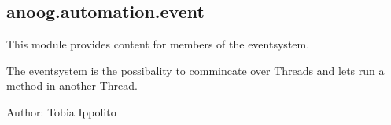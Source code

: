 \documentclass[letterpaper,10pt,english]{sphinxmanual}
\begin{document}
\begin{fulllineitems}

\begin{fulllineitems}
\label{\detokenize{anoog.automation:anoog.automation.controller.process_state.TRAIN_END}}
\end{fulllineitems}


\end{fulllineitems}



\subsection{anoog.automation.event}
\label{\detokenize{anoog.automation:module-anoog.automation.event}}\label{\detokenize{anoog.automation:anoog-automation-event}}
\sphinxAtStartPar
This module provides content for members of the eventsystem.

\sphinxAtStartPar
The eventsystem is the possibality to commincate over Threads and lets run a method in another Thread.

\sphinxAtStartPar
Author: Tobia Ippolito
\end{document}
